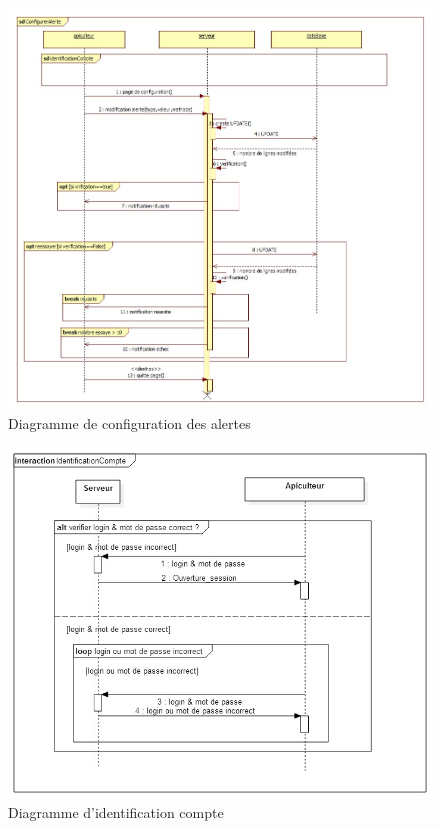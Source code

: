 \begin{figure}[h!]
\centering\includegraphics[scale=0.4]{configurerAlerte.jpg}
\caption{\label{fig:seq4} Diagramme de configuration des alertes}
\end{figure}
\begin{figure}[h!]
\centering\includegraphics[scale=0.7]{IdentificationCompte.jpg}
\caption{\label{fig:seq5} Diagramme d'identification compte}
\end{figure}
\pagebreak

